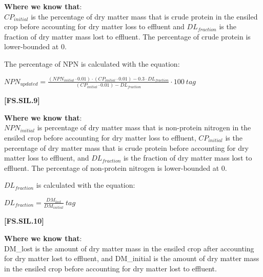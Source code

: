 \begin{refsection}
\textbf{Where we know that}: \\ \(CP_{initial}\) is the percentage of dry matter mass that is crude protein in the ensiled crop before accounting for dry matter loss to effluent and \(DL_{fraction}\) is the fraction of dry matter mass lost to effluent. The percentage of crude protein is lower-bounded at 0.
\vspace{0.2cm}

The percentage of NPN is calculated with the equation:
\vspace{0.2cm}

        \begin{center}
        \(NPN_{updated} = \frac{(NPN_{initial} \cdot 0.01) \cdot (CP_{initial} \cdot 0.01) - 0.3 \cdot DL_{fraction}}{(CP_{initial} \cdot 0.01) - DL_{fraction}} \cdot 100 \ tag\)
    \end{center}
        \vspace{0.5cm}
    
            {\raggedleft \textbf{[FS.SIL.9]}\par}
        \vspace{0.5cm}


\textbf{Where we know that}: \\ \(NPN_{initial}\) is percentage of dry matter mass that is non-protein nitrogen in the ensiled crop before accounting for dry matter loss to effluent, \(CP_{initial}\) is the percentage of dry matter mass that is crude protein before accounting for dry matter loss to effluent, and \(DL_{fraction}\) is the fraction of dry matter mass lost to effluent. The percentage of non-protein nitrogen is lower-bounded at 0. 
\vspace{0.2cm}

\(DL_{fraction}\) is calculated with the equation:
        \begin{center}
        \(DL_{fraction} = \frac{DM_{lost}}{DM_{initial}}\ tag\)
    \end{center}
        \vspace{0.5cm}
    
            {\raggedleft \textbf{[FS.SIL.10]}\par}
        \vspace{0.5cm}

\textbf{Where we know that}: \\ DM\_lost is the amount of dry matter mass in the ensiled crop after accounting for dry matter lost to effluent, and DM\_initial is the amount of dry matter mass in the ensiled crop before accounting for dry matter lost to effluent.


\end{refsection}

